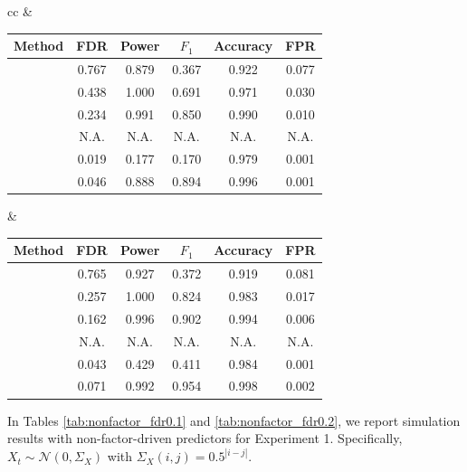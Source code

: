 ﻿\documentclass[12pt]{article}
\newcommand{\0}{\mbox{\bf 0}}
\theoremstyle{plain}%
\theoremstyle{definition}
\begin{document}
{\begin{table}[htbp]
\begin{tabular}{cc}
 &  \\
\begin{tabular}{lccccc}
\toprule
Method & FDR & Power & $F_1$ & Accuracy & FPR \\
\midrule
\sc{Lasso}         &     0.767  & 0.879  & 0.367  & 0.922  & 0.077  \\
\sc{FarmSelect}    &    0.438  & 1.000  & 0.691  & 0.971  & 0.030  \\
\sc{Model-X}       &     0.234  & 0.991  & 0.850  & 0.990  & 0.010  \\
\sc{Fixed-X}       & N.A.  & N.A.  & N.A.  & N.A.  & N.A.  \\
\sc{TSKI }         &    0.019  & 0.177  & 0.170  & 0.979  & 0.001  \\
\sc{FAR-Knockoff} & 0.046 & 0.888 & 0.894 & 0.996 & 0.001 \\

\bottomrule
\end{tabular}
&
\begin{tabular}{lccccc}
\toprule
Method & FDR & Power & $F_1$ & Accuracy & FPR \\
\midrule
\sc{Lasso}         &    0.765  & 0.927  & 0.372  & 0.919  & 0.081  \\
\sc{FarmSelect}    &    0.257  & 1.000  & 0.824  & 0.983  & 0.017  \\
\sc{Model-X}       &     0.162  & 0.996  & 0.902  & 0.994  & 0.006  \\
\sc{Fixed-X}       & N.A.  & N.A.  & N.A.  & N.A.  & N.A.  \\
\sc{TSKI}          &    0.043  & 0.429  & 0.411  & 0.984  & 0.001  \\
\sc{FAR-Knockoff} & 0.071 & 0.992 & 0.954 & 0.998 & 0.002 \\

\bottomrule
\end{tabular}
\end{tabular}
\end{table}



In Tables \ref{tab:nonfactor_fdr0.1} and \ref{tab:nonfactor_fdr0.2}, we report simulation results with non-factor-driven predictors for Experiment 1. Specifically, $X_{t} \sim \mathcal{N}(0, \Sigma_{X})$ with $\Sigma_{X}(i,j) = 0.5^{|i-j|}$.
 

}
\end{document}
